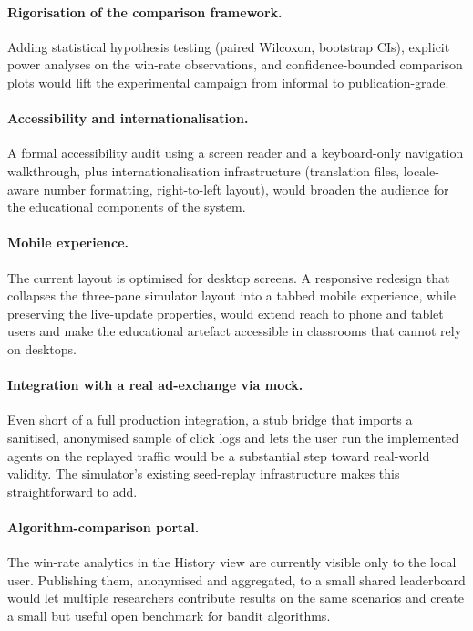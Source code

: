 \paragraph{Rigorisation of the comparison framework.} Adding statistical hypothesis testing (paired Wilcoxon, bootstrap CIs), explicit power analyses on the win-rate observations, and confidence-bounded comparison plots would lift the experimental campaign from informal to publication-grade.

\paragraph{Accessibility and internationalisation.} A formal accessibility audit using a screen reader and a keyboard-only navigation walkthrough, plus internationalisation infrastructure (translation files, locale-aware number formatting, right-to-left layout), would broaden the audience for the educational components of the system.

\paragraph{Mobile experience.} The current layout is optimised for desktop screens. A responsive redesign that collapses the three-pane simulator layout into a tabbed mobile experience, while preserving the live-update properties, would extend reach to phone and tablet users and make the educational artefact accessible in classrooms that cannot rely on desktops.

\paragraph{Integration with a real ad-exchange via mock.} Even short of a full production integration, a stub bridge that imports a sanitised, anonymised sample of click logs and lets the user run the implemented agents on the replayed traffic would be a substantial step toward real-world validity. The simulator's existing seed-replay infrastructure makes this straightforward to add.

\paragraph{Algorithm-comparison portal.} The win-rate analytics in the History view are currently visible only to the local user. Publishing them, anonymised and aggregated, to a small shared leaderboard would let multiple researchers contribute results on the same scenarios and create a small but useful open benchmark for bandit algorithms.

